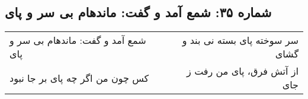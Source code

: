 \begin{center}
\section*{شماره ۳۵: شمع آمد و گفت: ماندهام بی سر و پای}
\label{sec:035}
\begin{longtable}{l p{0.5cm} r}
شمع آمد و گفت: ماندهام بی سر و پای
&&
سر سوخته پای بسته نی بند و گشای
\\
کس چون من اگر چه پای بر جا نبود
&&
از آتش فرق، پای من رفت ز جای
\\
\end{longtable}
\end{center}
